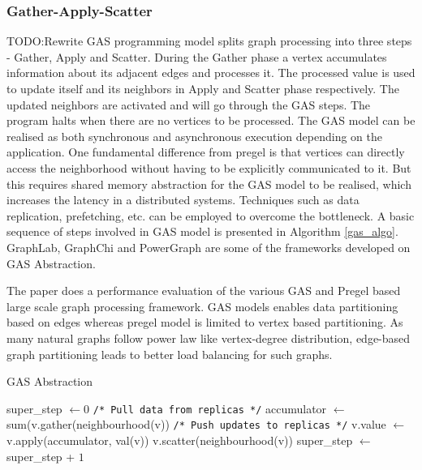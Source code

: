 \subsubsection{Gather-Apply-Scatter}
TODO:Rewrite
GAS programming model splits graph processing into three steps - Gather, Apply and Scatter. During the Gather phase a vertex accumulates information about its adjacent edges and processes it. The processed value is used to update itself and its neighbors in Apply and Scatter phase respectively. The updated neighbors are activated and will go through the GAS steps. The program halts when there are no vertices to be processed. The GAS model can be realised as both synchronous and asynchronous execution depending on the application. One fundamental difference from pregel is that vertices can directly access the neighborhood without having to be explicitly communicated to it. But this requires shared memory abstraction for the GAS model to be realised, which increases the latency in a distributed systems. Techniques such as data replication, prefetching, etc. can be employed to overcome the bottleneck. A basic sequence of steps involved in GAS model is presented in Algorithm \ref{gas_algo}. GraphLab, GraphChi and PowerGraph are some of the frameworks developed on GAS Abstraction. 

The paper \cite{graphFwSurvey} does a performance evaluation of the various GAS and Pregel based large scale graph processing framework. GAS models enables data partitioning based on edges whereas pregel model is limited to vertex based partitioning. As many natural graphs follow power law like vertex-degree distribution, edge-based graph partitioning leads to better load balancing for such graphs.

\begin{algorithm}
\caption{GAS Abstraction}
\label{gas_algo}
\begin{algorithmic}[1]
  \State super\_step $\gets 0$
      \State \texttt{\small /* Pull data from replicas */}
      \State accumulator $\gets$ sum(v.gather(neighbourhood(v))
      \State \texttt{\small /* Push updates to replicas */}
      \State v.value $\gets$ v.apply(accumulator, val(v))
      \State v.scatter(neighbourhood(v))
    \EndFor
  \EndWhile
  \State super\_step $\gets$ super\_step + $1$

\end{algorithmic}
\end{algorithm}

